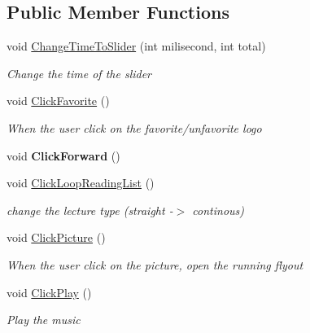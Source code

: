 \subsection*{Public Member Functions}
\begin{DoxyCompactItemize}
\item 
void \hyperlink{class_presentation_1_1_view_model_1_1_player_view_model_ae27f5e428604e168e00216a5775e4f20}{Change\+Time\+To\+Slider} (int milisecond, int total)
\begin{DoxyCompactList}\small\item\em Change the time of the slider \end{DoxyCompactList}\item 
void \hyperlink{class_presentation_1_1_view_model_1_1_player_view_model_af4b8393d4c9fa02c0f77ae12b43ddf26}{Click\+Favorite} ()
\begin{DoxyCompactList}\small\item\em When the user click on the favorite/unfavorite logo \end{DoxyCompactList}\item 
\mbox{\label{class_presentation_1_1_view_model_1_1_player_view_model_a4abef53bb3e901572373320a0f9bb573}} 
void {\bfseries Click\+Forward} ()
\item 
void \hyperlink{class_presentation_1_1_view_model_1_1_player_view_model_aa465600947e868db782dcefc4c583397}{Click\+Loop\+Reading\+List} ()
\begin{DoxyCompactList}\small\item\em change the lecture type (straight -\/$>$ continous) \end{DoxyCompactList}\item 
void \hyperlink{class_presentation_1_1_view_model_1_1_player_view_model_ac179d33971d45dca1de5807ad70541f3}{Click\+Picture} ()
\begin{DoxyCompactList}\small\item\em When the user click on the picture, open the running flyout \end{DoxyCompactList}\item 
void \hyperlink{class_presentation_1_1_view_model_1_1_player_view_model_aab7033d6e657e0d4655c07c2e9a64527}{Click\+Play} ()
\begin{DoxyCompactList}\small\item\em Play the music \end{DoxyCompactList}\item 

\end{DoxyCompactItemize}
